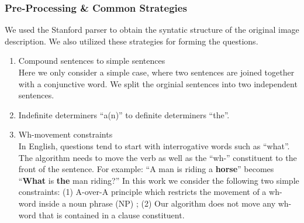 \documentclass{article}
\renewcommand{\*}[1]{\textbf{#1}}
\begin{document}
\subsubsection{Pre-Processing \& Common Strategies}
We used the Stanford parser \cite{klein03} to obtain the syntatic structure 
of the original image description. We also utilized these strategies for 
forming the questions.
\begin{enumerate}[leftmargin=*]
\item Compound sentences to simple sentences \\
Here we only consider a simple case, where two sentences are joined together 
with a conjunctive word. We split the orginial sentences into two independent 
sentences. 
\item Indefinite determiners ``a(n)'' to definite determiners ``the''.
\item Wh-movement constraints \\
In English, questions tend to start with interrogative words such as ``what''. 
The algorithm needs to move the verb as well as the ``wh-'' constituent to 
the front of the sentence. 
For example: ``A man is riding a \*{horse}'' becomes ``\*{What} is 
\*{the} man riding?''
In this work we consider the following two simple constraints: (1) A-over-A 
principle which restricts the movement of a wh-word inside a noun phrase (NP) 
\cite{chomsky73}; (2) Our algorithm does not move any wh-word that is contained 
in a clause constituent.
\end{enumerate}
\end{document}
